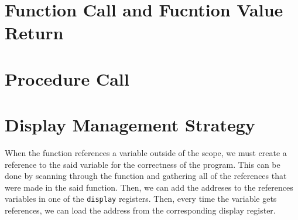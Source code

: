 \documentclass{article}
\begin{document}
\section{Function Call and Fucntion Value Return}

\section{Procedure Call}

\section{Display Management Strategy} \label{display}

When the function references a variable outside of the scope, we must create a reference to the said variable for the correctness of the program. This can be done by scanning through the function and gathering all of the references that were made in the said function. Then, we can add the addreses to the references variables in one of the {\tt display} registers. Then, every time the variable gets references, we can load the address from the corresponding display register.

\end{document}

